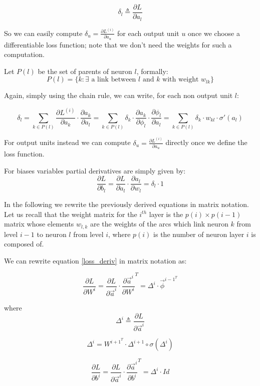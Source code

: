 \begin{equation}
\delta_l \triangleq \frac{\partial L}{\partial a_l}
\end{equation}



So we can easily compute $\delta_u = \frac{\partial L^{(i)}}{\partial a_u} $ for each output unit $u$ once we choose a differentiable loss function; note
that we don't need the weights for such a computation. 

Let $P(l)$ be the set of parents of neuron $l$, formally:
\begin{equation} 
P(l) = \{ k: \exists \text{ a link between $l$ and $k$ with weight } w_{lk} \}
\end{equation}

Again, simply using the chain rule, we can write, for each non output unit $l$:

\begin{equation}
\label{loss_deriv}
\delta_l = \sum_{k\in P(l)} \frac{\partial L^{(i)}}{\partial a_k} \cdot \frac{\partial a_k}{\partial a_l}= \sum_{k\in P(l)} \delta_k \cdot 
\frac{\partial a_k}{\partial \phi_l} \cdot \frac{\partial \phi_l}{\partial a_l} = \sum_{k\in P(l)} \delta_k \cdot 
w_{kl} \cdot \sigma'(a_l)
\end{equation}


For output units instead we can compute $\delta_u = \frac{\partial L^{(i)}}{\partial a_u} $ directly once we define the loss function.

For biases variables partial derivatives are simply given by:
$$\frac{\partial L}{\partial b_{l}}=\frac{\partial L}{\partial a_l} \cdot \frac{\partial a_l}{\partial w_{l}}=\delta_l \cdot 1$$




In the following we rewrite the previously derived equations in matrix notation.
Let us recall that the weight matrix for the $i^{th}$ layer is the $p(i) \times p(i-1)$ matrix whose elements $w_{l,k}$ are the weights of the arcs which link neuron $k$ from level $i-1$ to neuron $l$ from level $i$, where
$p(i)$ is the number of neuron layer $i$ is composed of.


We can rewrite equation \ref{loss_deriv} in matrix notation as:

\begin{equation}
 \frac{\partial L}{\partial W^i} = \frac{\partial L}{\partial \vec{a}^{i}} \cdot\frac{\partial \vec{a}^{i}}{\partial W^i}^T =
 \Delta^i \cdot \vec{\phi}^{{i-1}^T}
\end{equation}

where
\begin{equation}
\Delta^i  \triangleq  \frac{\partial L}{\partial \vec{a}^{i}} 
\end{equation}

\begin{equation}
 \Delta^i = W^{{i+1}^T} \cdot \Delta^{i+1} \circ \sigma(\Delta^i)
\end{equation} 

\begin{equation}
 \frac{\partial L}{\partial b^i} = \frac{\partial L}{\partial \vec{a}^{i}} \cdot\frac{\partial \vec{a}^{i}}{\partial b^i}^T =
 \Delta^i \cdot Id
\end{equation}
